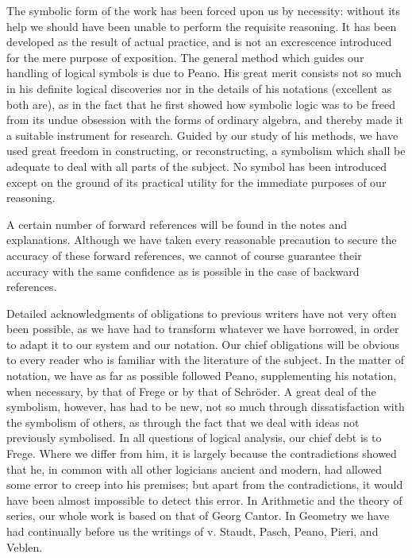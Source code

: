 \documentclass[letterpaper,12pt,openany,leqno]{book}
\newcommand{\pagefirst}[1]{\marginnote[\boxed{\text{#1}}]{\boxed{\text{#1}}}}
\begin{document}
The symbolic form of the work has been forced upon us by necessity: without its help we should have been unable to perform the requisite reasoning. It has been developed as the result of actual practice, and is not an excrescence introduced for the mere purpose of exposition. The general method which guides our handling of logical symbols is due to Peano. His great merit consists not so much in his definite logical discoveries nor in the details of his notations (excellent as both are), as in the fact that he first showed how symbolic logic was to be freed from its undue obsession with the forms of ordinary algebra, and thereby made it a suitable instrument for research. Guided by our study of his methods, we have used great freedom in constructing, or reconstructing, a symbolism which shall be adequate to deal with all parts of the subject. No symbol has been introduced except on the ground of its practical utility for the immediate purposes of our reasoning.

A certain number of forward references will be found in the notes and explanations. Although we have taken every reasonable precaution to secure the accuracy of these forward references, we cannot of course guarantee their accuracy with the same confidence as is possible in the case of backward references.

Detailed acknowledgments of obligations to previous writers have not very often been possible, as we have had to transform whatever we have borrowed, in order to adapt it to our system and our notation. Our chief obligations will be obvious to every reader who is familiar with the literature of the subject. In the matter of notation, we have as far as possible followed Peano, supplementing his notation, when necessary, by that of Frege or by that of Schr{\"o}der. A great deal of the symbolism, however, has had to be new, not so much through dissatisfaction with the symbolism of others, as through the fact that we deal with ideas not previously symbolised. In all \pagefirst{ix} questions of logical analysis, our chief debt is to Frege. Where we differ from him, it is largely because the contradictions showed that he, in common with all other logicians ancient and modern, had allowed some error to creep into his premises; but apart from the contradictions, it would have been almost impossible to detect this error. In Arithmetic and the theory of series, our whole work is based on that of Georg Cantor. In Geometry we have had continually before us the writings of v. Staudt, Pasch, Peano, Pieri, and Veblen.
\end{document}
